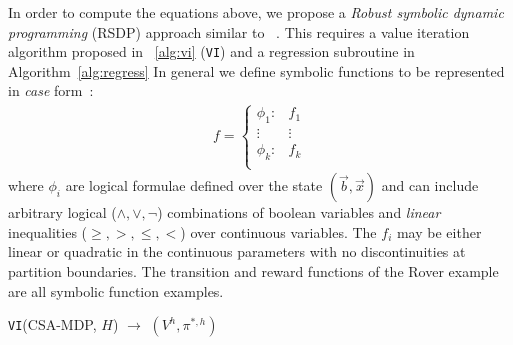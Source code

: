 
In order to compute the equations above, we propose a \emph{Robust symbolic dynamic programming} (RSDP) approach similar to ~\cite{sanner_uai11}.  This requires a value iteration algorithm proposed in ~\ref{alg:vi} (\texttt{VI})
and a regression subroutine in Algorithm~\ref{alg:regress}
In general we define symbolic functions to be represented in \emph{case} form~\cite{fomdp}:
{%
\begin{align}
f = 
\begin{cases}
  \phi_1: & f_1 \\ 
 \vdots&\vdots\\ 
  \phi_k: & f_k \\ 
\end{cases} \label{eq:case}
\end{align}
}
where $\phi_i$ are logical formulae defined over the state
$(\vec{b},\vec{x})$ and can include arbitrary logical ($\land,\lor,\neg$)
combinations of boolean variables and \emph{linear} inequalities ($\geq,>,\leq,<$) 
over continuous variables.  
The $f_i$ may be either linear or quadratic in the continuous parameters with no discontinuities at partition boundaries. The transition and reward functions of the Rover example are all symbolic function examples. 
\incmargin{.5em}
\linesnumbered
\begin{algorithm}[t!]
\vspace{-.5mm}
\dontprintsemicolon
{}
\caption{\footnotesize \texttt{VI}(CSA-MDP, $H$) $\longrightarrow$ $(V^h,\pi^{*,h})$ \label{alg:vi}}
\vspace{-1mm}
\end{algorithm}
\decmargin{.5em}

